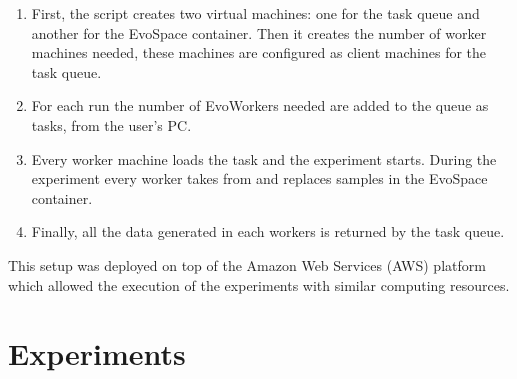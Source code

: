 \documentclass[conference]{IEEEtran}
\begin{document}
\begin{enumerate}
    \item First, the script creates two virtual machines: one for the task queue and another
    for the EvoSpace container. Then it creates the number of worker machines needed, these
    machines are configured as client machines for the task queue.
    \item For each run the number of EvoWorkers needed are added to the queue as tasks, from
    the user's PC.
    \item Every worker machine loads the task and the experiment
      starts. During the experiment every worker takes from and replaces
      samples in the EvoSpace container.
    \item Finally, all the data generated in each workers is returned by the task queue.
    \end{enumerate}

This setup was deployed on top of the Amazon Web Services (AWS)
platform which allowed the execution of the experiments with similar computing resources.

\section{Experiments}
 \label{sec:experiments}
\end{document}
